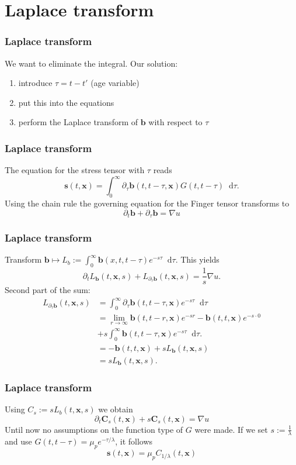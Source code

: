 \documentclass[12pt,a4paper,handout]{beamer}
\theoremstyle{definition}
\theoremstyle{plain}
\newcommand{\bfb}{\bm{b}}
\newcommand{\bfs}{\bm{s}}
\newcommand{\bfC}{\bm{C}}
\newcommand{\bfx}{\bm{x}}
\newcommand{\D}{\mathop{}\!\mathrm{d}}
\begin{document}
\section{Laplace transform}
\begin{frame}
    \frametitle{Laplace transform}
    We want to eliminate the integral. Our solution: 
    \begin{enumerate}[<+->]
        \item introduce $\tau= t-t'$ (age variable)
        \item put this into the equations
        \item perform the Laplace transform of $\bfb$ with respect to $\tau$
    \end{enumerate}
\end{frame}
\begin{frame}
    \frametitle{Laplace transform}
    The equation for the stress tensor with $\tau$ reads
    \begin{equation*}
        \bfs(t,\bfx)=\int_0^\infty\partial_\tau\bfb(t,t-\tau,\bfx)G(t,t-\tau)\D\tau.
    \end{equation*}
   Using the chain rule the governing equation for the Finger tensor transforms to  
   \begin{equation*}
   \partial_t \bfb +\partial_\tau\bfb=\nabla u
   \end{equation*}
\end{frame}
\begin{frame}
    \frametitle{Laplace transform}
    Transform $\bfb\mapsto L_b:=\int_0^\infty \bfb(x,t,t-\tau)e^{-s\tau}\D \tau$. This yields
    \begin{equation*}
    \partial_tL_{\bfb}(t,\bfx,s) + L_{\partial_\tau\bfb}(t,\bfx,s) = \frac{1}{s}\nabla u.
    \end{equation*}
    Second part of the sum:
        \begin{align*}
        L_{\partial_\tau\bfb}(t,\bfx,s) &= \int_0^\infty\partial_\tau\bfb(t,t-\tau,\bfx)e^{-s\tau}\D\tau\\ &=\lim_{r\to\infty}\bfb(t,t-r,\bfx)e^{-sr}-\bfb(t,t,\bfx)e^{-s\cdot 0}\\&+s\int_0^\infty\bfb(t,t-\tau,\bfx)e^{-s\tau}\D\tau.\\
        &= -\bfb(t,t,\bfx) +sL_{\bfb}(t,\bfx, s)\\
        &= sL_{\bfb}(t,\bfx,s).
        \end{align*}
\end{frame}
\begin{frame}
    \frametitle{Laplace transform}
    Using $C_s:=sL_b(t,\bfx,s)$ we obtain
    \begin{equation*}
         \partial_t\bfC_s(t,\bfx)+s\bfC_s(t,\bfx)=\nabla u
    \end{equation*}
    Until now no assumptions on the function type of $G$ were made.
    If we set $s:=\frac{1}{\lambda}$ and use $G(t,t-\tau)=\mu_pe^{-\tau/\lambda}$, it follows
    \begin{equation*}
        \bfs(t,\bfx)=\mu_pC_{1/\lambda}(t,\bfx)
    \end{equation*}
\end{frame}
\end{document}
